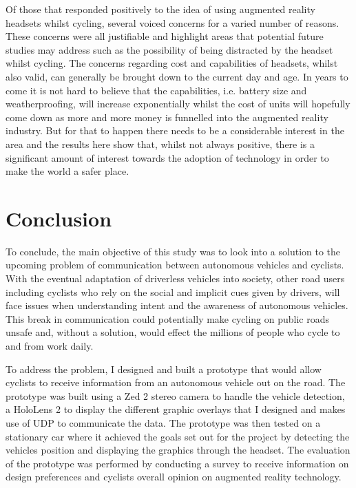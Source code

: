\documentclass{l4proj}
\begin{document}
Of those that responded positively to the idea of using augmented reality headsets whilst cycling, several voiced concerns for a varied number of reasons. These concerns were all justifiable and highlight areas that potential future studies may address such as the possibility of being distracted by the headset whilst cycling. The concerns regarding cost and capabilities of headsets, whilst also valid, can generally be brought down to the current day and age. In years to come it is not hard to believe that the capabilities, i.e. battery size and weatherproofing, will increase exponentially whilst the cost of units will hopefully come down as more and more money is funnelled into the augmented reality industry. But for that to happen there needs to be a considerable interest in the area and the results here show that, whilst not always positive, there is a significant amount of interest towards the adoption of technology in order to make the world a safer place.

\chapter{Conclusion}    

To conclude, the main objective of this study was to look into a solution to the upcoming problem of communication between autonomous vehicles and cyclists. With the eventual adaptation of driverless vehicles into society, other road users including cyclists who rely on the social and implicit cues given by drivers, will face issues when understanding intent and the awareness of autonomous vehicles. This break in communication could potentially make cycling on public roads unsafe and, without a solution, would effect the millions of people who cycle to and from work daily.

To address the problem, I designed and built a prototype that would allow cyclists to receive information from an autonomous vehicle out on the road. The prototype was built using a Zed 2 stereo camera to handle the vehicle detection, a HoloLens 2 to display the different graphic overlays that I designed and makes use of UDP to communicate the data. The prototype was then tested on a stationary car where it achieved the goals set out for the project by detecting the vehicles position and displaying the graphics through the headset. The evaluation of the prototype was performed by conducting a survey to receive information on design preferences and cyclists overall opinion on augmented reality technology.
\end{document}
